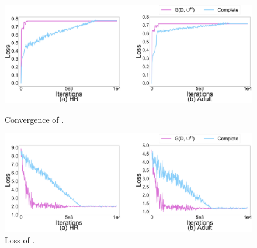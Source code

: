 










\begin{figure}[t]   
	\centering
	\begin{minipage}[t]{0.49\textwidth}
		\centering
		\includegraphics[width=\columnwidth]{figs/G_a}
		\caption{Convergence of \ours.}
		\label{fig:converge_G}
	\end{minipage}
	\begin{minipage}[t]{0.49\textwidth}
		\centering
		\includegraphics[width=\columnwidth]{figs/G}
		\caption{Loss of \ours.}
		\label{fig:real_loss_G}
	\end{minipage}
	\vspace*{-1em}   
\end{figure}

